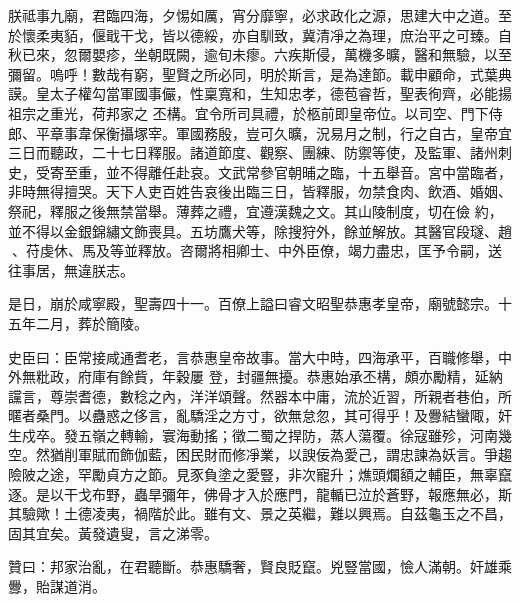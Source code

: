 \begin{pinyinscope}
 朕祗事九廟，君臨四海，夕惕如厲，宵分靡寧，必求政化之源，思建大中之道。至於懷柔夷貊，偃戢干戈，皆以德綏，亦自馴致，冀清凈之為理，庶治平之可臻。自秋已來，忽爾嬰疹，坐朝既闕，逾旬未瘳。六疾斯侵，萬機多曠，醫和無驗，以至彌留。嗚呼！數哉有窮，聖賢之所必同，明於斯言，是為達節。載申顧命，式葉典謨。皇太子權勾當軍國事儼，性稟寬和，生知忠孝，德苞睿哲，聖表徇齊，必能揚祖宗之重光，荷邦家之
 丕構。宜令所司具禮，於柩前即皇帝位。以司空、門下侍郎、平章事韋保衡攝塚宰。軍國務殷，豈可久曠，況易月之制，行之自古，皇帝宜三日而聽政，二十七日釋服。諸道節度、觀察、團練、防禦等使，及監軍、諸州刺史，受寄至重，並不得離任赴哀。文武常參官朝晡之臨，十五舉音。宮中當臨者，非時無得擅哭。天下人吏百姓告哀後出臨三日，皆釋服，勿禁食肉、飲酒、婚姻、祭祀，釋服之後無禁當舉。薄葬之禮，宜遵漢魏之文。其山陵制度，切在儉
 約，並不得以金銀錦繡文飾喪具。五坊鷹犬等，除搜狩外，餘並解放。其醫官段璲、趙、苻虔休、馬及等並釋放。咨爾將相卿士、中外臣僚，竭力盡忠，匡予令嗣，送往事居，無違朕志。



 是日，崩於咸寧殿，聖壽四十一。百僚上謚曰睿文昭聖恭惠孝皇帝，廟號懿宗。十五年二月，葬於簡陵。



 史臣曰：臣常接咸通耆老，言恭惠皇帝故事。當大中時，四海承平，百職修舉，中外無粃政，府庫有餘貲，年穀屢
 登，封疆無擾。恭惠始承丕構，頗亦勵精，延納讜言，尊崇耆德，數稔之內，洋洋頌聲。然器本中庸，流於近習，所親者巷伯，所暱者桑門。以蠱惑之侈言，亂驕淫之方寸，欲無怠忽，其可得乎！及釁結蠻陬，奸生戍卒。發五嶺之轉輸，寰海動搖；徵二蜀之捍防，蒸人蕩覆。徐寇雖殄，河南幾空。然猶削軍賦而飾伽藍，困民財而修凈業，以諛佞為愛己，謂忠諫為妖言。爭趨險陂之途，罕勵貞方之節。見豕負塗之愛豎，非次寵升；燋頭爛額之輔臣，無辜竄
 逐。是以干戈布野，蟲旱彌年，佛骨才入於應門，龍輴已泣於蒼野，報應無必，斯其驗歟！土德凌夷，禍階於此。雖有文、景之英繼，難以興焉。自茲龜玉之不昌，固其宜矣。黃發遺叟，言之涕零。



 贊曰：邦家治亂，在君聽斷。恭惠驕奢，賢良貶竄。兇豎當國，憸人滿朝。奸雄乘釁，貽謀道消。



\end{pinyinscope}